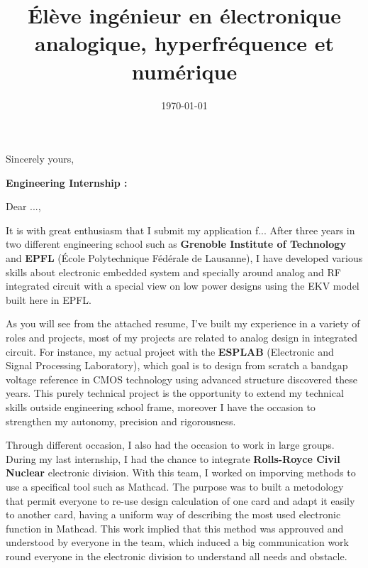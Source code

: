 \documentclass[11pt,a4paper]{moderncv}
\title{Élève ingénieur en électronique analogique, hyperfréquence et numérique}
\newcommand{\entreprise}{Entreprise}
\begin{document}

\recipient{\entreprise}{RUE,\\ CP VILLE,\\ PAYS} %
\date{\today} %
\opening{} %
\closing{Sincerely yours,} %

\makelettertitle %
\justify

\textbf{Engineering Internship :  }
\newline{}

Dear ...,\newline{}

\hspace{0.8cm} It is with great enthusiasm that I submit my application f...
After three years in two different engineering school such as \textbf{Grenoble Institute of Technology} and \textbf{EPFL} (École Polytechnique Fédérale de Lausanne), I have developed various skills about electronic embedded system and specially around analog and RF integrated circuit with a special view on low power designs using the EKV model built here in EPFL. 


\hspace{0.8cm} As you will see from the attached resume, I’ve built my experience in a variety of roles and projects, most of my projects are related to analog design in integrated circuit. For instance, my actual project with the \textbf{ESPLAB} (Electronic and Signal Processing Laboratory), which goal is to design from scratch a bandgap voltage reference in CMOS technology using advanced structure discovered these years. This purely technical project is the opportunity to extend my technical skills outside engineering school frame, moreover I have the occasion to strengthen my autonomy, precision and rigorousness.

\hspace{0.8cm} Through different occasion, I also had the occasion to work in large groups. During my last internship, I had the chance to integrate \textbf{Rolls-Royce Civil Nuclear} electronic division.
With this team, I worked on imporving methods to use a specifical tool such as Mathcad. 
The purpose was to built a metodology that permit everyone to re-use design calculation of one card and adapt it easily to another card, having a uniform way of describing the most used electronic function in Mathcad. 
This work implied that this method was approuved and understood by everyone in the team, which induced a big communication work round everyone in the electronic division to understand all needs and obstacle. 
\end{document}
